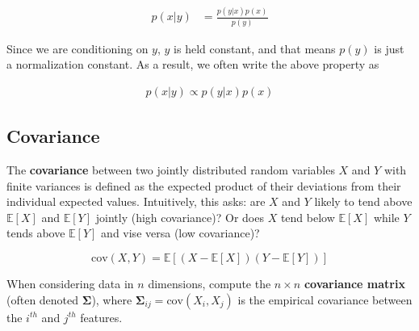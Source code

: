 \documentclass{harvardml}
\theoremstyle{definition}
\theoremstyle{plain}
\newcommand{\E}{\mathbb{E}}
\newcommand{\cov}{\text{cov}}
\newcommand{\boldw}{\mathbf{w}}
\DeclareMathOperator*{\argmax}{arg\,max}
\renewcommand{\v}[1]{\mathbf{#1}}
\begin{document}
			\begin{align*}
  				p(x | y) &= \frac{p(y | x) p(x)}{p(y)}
			\end{align*}

			\noindent Since we are conditioning on $y$, $y$ is held constant, 
			and that means $p(y)$ is just a normalization constant. 
			As a result, we often write the above property as

			\begin{align*}
  				p(x | y) \propto p(y | x) p(x)
			\end{align*}




	\subsection{Covariance}

        The \textbf{covariance} between two jointly distributed random 
		variables $X$ and $Y$ with finite variances is defined as the 
		expected product of their deviations from their individual 
		expected values. Intuitively, this asks: are $X$ and $Y$ 
		likely to tend above $\E[X]$ and $\E[Y]$ jointly (high covariance)? 
		Or does $X$ tend below $\E[X]$ while $Y$ tends above $\E[Y]$ and 
		vise versa (low covariance)?
        
        $$ \cov(X,Y) = \E[(X - \E[X])(Y - \E[Y])]$$

        \noindent When considering data in $n$ dimensions, 
        compute the $n \times n$ \textbf{covariance matrix} 
        (often denoted $\v \Sigma$), where $\v \Sigma_{ij} = 
        \cov(X_i,X_j)$ is the empirical covariance between the 
        $i^{th}$ and $j^{th}$ features.\\
        
\end{document}
